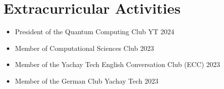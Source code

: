 \documentclass[a4paper,12pt]{article}
\begin{document}
\section{Extracurricular Activities}
\begin{itemize}
    \item President of the Quantum Computing Club YT \hfill {2024}
    \item Member of Computational Sciences Club \hfill {2023}
    \item Member of the Yachay Tech English Conversation Club (ECC) \hfill {2023}
    \item Member of the German Club Yachay Tech \hfill {2023}
\end{itemize}

\vfill
{}
\end{document}
